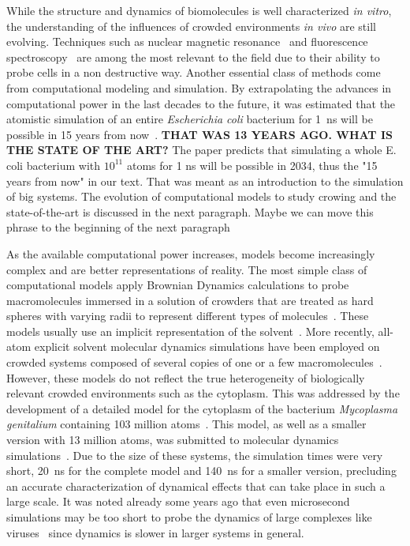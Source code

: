 \documentclass[journal=jcisd8,manuscript=article]{achemso}
\begin{document}
While the structure and dynamics of biomolecules is well characterized
\textit{in vitro}, the understanding of the influences of crowded
environments \textit{in vivo} are still evolving.  Techniques such as
nuclear magnetic resonance~\cite{reckel2007,pielak2008} and
fluorescence spectroscopy~\cite{ignatova2004,xie2008,English2011} are
among the most relevant to the field due to their ability to probe
cells in a non destructive way. Another essential class of methods
come from computational modeling and simulation. By extrapolating the
advances in computational power in the last decades to the future, it
was estimated that the atomistic simulation of an entire
\textit{Escherichia coli} bacterium for \SI{1}{\nano\second} will be
possible in 15 years from now~\cite{vanGunsteren2006a}. {\bf THAT WAS
  13 YEARS AGO. WHAT IS THE STATE OF THE ART?} {\color{blue} The paper predicts that simulating a whole E. coli bacterium with $10^{11}$ atoms for 1 ns will be possible in 2034, thus the "15 years from now" in our text. That was meant as an introduction to the simulation of big systems. The evolution of computational models to study crowing and the state-of-the-art is discussed in the next paragraph. Maybe we can move this phrase to the beginning of the next paragraph }

As the available computational power increases, models become
increasingly complex and are better representations of reality. The
most simple class of computational models apply Brownian Dynamics
calculations to probe macromolecules immersed in a solution of
crowders that are treated as hard spheres with varying radii to
represent different types of molecules~\cite{Ando2010}. These models
usually use an implicit representation of the
solvent~\cite{Mcguffee2010}. More recently, all-atom explicit solvent
molecular dynamics simulations have been employed on crowded systems
composed of several copies of one or a few
macromolecules~\cite{Wang2017c}. However, these models do not reflect
the true heterogeneity of biologically relevant crowded environments
such as the cytoplasm. This was addressed by the development of a
detailed model for the cytoplasm of the bacterium \textit{Mycoplasma
  genitalium} containing 103 million atoms~\cite{Feig2015}. This
model, as well as a smaller version with 13 million atoms, was
submitted to molecular dynamics simulations~\cite{Yu2016a}. Due to the
size of these systems, the simulation times were very short,
\SI{20}{\nano\second} for the complete model and
\SI{140}{\nano\second} for a smaller version, precluding an accurate
characterization of dynamical effects that can take place in such a
large scale. It was noted already some years ago that even
{microsecond} simulations may be too short to probe the dynamics of
large complexes like viruses~\cite{Larsson2012a} since dynamics is
slower in larger systems in general.
\end{document}
